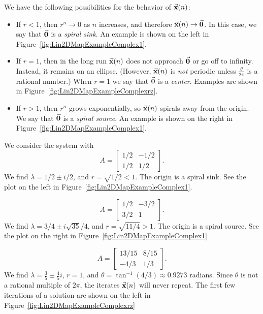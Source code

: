We have the following possibilities
for the behavior of $\vec{\textbf{x}}(n)$:
\begin{itemize}
\item
If $r < 1$, then $r^n \rightarrow 0$ as $n$ increases,
and therefore $\vec{\textbf{x}}(n)\rightarrow \vec{\textbf{0}}$.
In this case, we say that $\vec{\textbf{0}}$ is a \emph{spiral sink}.
An example is shown on the left in Figure~\ref{fig:Lin2DMapExampleComplex1}.
\item
If $r=1$, then in the long run $\vec{\textbf{x}}(n)$ does not approach
$\vec{\textbf{0}}$ or go off to infinity. Instead, it remains on an ellipse.
(However, $\vec{\textbf{x}}(n)$ is \emph{not} periodic unless
$\frac{\theta}{2\pi}$ is a rational number.)
When $r=1$ we say that $\vec{\textbf{0}}$ is a \emph{center}.
Examples are shown in Figure~\ref{fig:Lin2DMapExampleComplexrz}.
\item
If $r > 1$, then $r^n$ grows exponentially, so $\vec{\textbf{x}}(n)$
spirals away from the origin.  We say that $\vec{\textbf{0}}$ is 
a \emph{spiral source}.
An example is shown on the right in 
Figure~\ref{fig:Lin2DMapExampleComplex1}.
\end{itemize}

\begin{xexample}
We consider the system with
\begin{equation}
  A = \begin{bmatrix} 1/2 & -1/2\\ 1/2 & 1/2\end{bmatrix}.
\end{equation}
We find $\lambda = 1/2 \pm i/2$, and $r = \sqrt{1/2} < 1$.
The origin is a spiral sink.
See the plot on the left in Figure~\ref{fig:Lin2DMapExampleComplex1}.
\end{xexample}

\begin{xexample}
\begin{equation}
  A = \begin{bmatrix} 1/2 & -3/2\\ 3/2 & 1\end{bmatrix}.
\end{equation}
We find $\lambda = 3/4 \pm i\sqrt{35}/4$, and $r = \sqrt{11/4} > 1$.
The origin is a spiral source.
See the plot on the right in Figure~\ref{fig:Lin2DMapExampleComplex1}
\end{xexample}

\begin{xexample}
\begin{equation}
A = \begin{bmatrix} 13/15 & 8/15 \\ -4/3 & 1/3 \end{bmatrix}.
\end{equation}
We find $\lambda = \frac{3}{5}\pm \frac{4}{5}i$, $r=1$,
and $\theta = \tan^{-1}(4/3)\approx 0.9273$ radians.
Since $\theta$ is not a rational multiple of $2\pi$,
the iterates $\vec{\textbf{x}}(n)$ will never repeat.
The first few iterations of a solution are shown
on the left
in Figure~\ref{fig:Lin2DMapExampleComplexrz}
\end{xexample}

